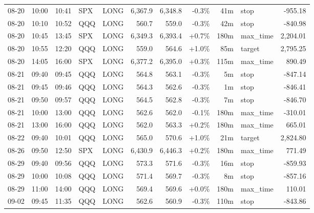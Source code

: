 \documentclass[11pt,a4paper,twoside]{article}
\begin{document}
\begin{center}
\begin{longtable}{>{\color{txtmain}}l l l l l r r r r >{\color{txtmain}}l r}
08-20 & 10:00 & 10:41 & SPX & LONG & 6,367.9 & 6,348.8 & \textcolor{lossred}{-0.3\%} & 41m & stop & \textcolor{lossred}{-955.18} \\
08-20 & 10:10 & 10:52 & QQQ & LONG & 560.7 & 559.0 & \textcolor{lossred}{-0.3\%} & 42m & stop & \textcolor{lossred}{-840.98} \\
08-20 & 10:45 & 13:45 & SPX & LONG & 6,349.3 & 6,393.4 & \textcolor{wingreen}{+0.7\%} & 180m & max\_time & \textcolor{wingreen}{2,204.01} \\
08-20 & 10:55 & 12:20 & QQQ & LONG & 559.0 & 564.6 & \textcolor{wingreen}{+1.0\%} & 85m & target & \textcolor{wingreen}{2,795.25} \\
08-20 & 14:05 & 16:00 & SPX & LONG & 6,377.2 & 6,395.0 & \textcolor{wingreen}{+0.3\%} & 115m & max\_time & \textcolor{wingreen}{890.49} \\
08-21 & 09:40 & 09:45 & QQQ & LONG & 564.8 & 563.1 & \textcolor{lossred}{-0.3\%} & 5m & stop & \textcolor{lossred}{-847.14} \\
08-21 & 09:45 & 09:46 & QQQ & LONG & 564.3 & 562.6 & \textcolor{lossred}{-0.3\%} & 1m & stop & \textcolor{lossred}{-846.41} \\
08-21 & 09:50 & 09:57 & QQQ & LONG & 564.5 & 562.8 & \textcolor{lossred}{-0.3\%} & 7m & stop & \textcolor{lossred}{-846.70} \\
08-21 & 10:00 & 13:00 & QQQ & LONG & 562.6 & 562.0 & \textcolor{lossred}{-0.1\%} & 180m & max\_time & \textcolor{lossred}{-310.01} \\
08-21 & 13:00 & 16:00 & QQQ & LONG & 562.0 & 563.3 & \textcolor{wingreen}{+0.2\%} & 180m & max\_time & \textcolor{wingreen}{665.01} \\
08-22 & 09:40 & 10:01 & QQQ & LONG & 565.0 & 570.6 & \textcolor{wingreen}{+1.0\%} & 21m & target & \textcolor{wingreen}{2,824.80} \\
08-26 & 09:50 & 12:50 & SPX & LONG & 6,430.9 & 6,446.3 & \textcolor{wingreen}{+0.2\%} & 180m & max\_time & \textcolor{wingreen}{771.49} \\
08-29 & 09:40 & 09:56 & QQQ & LONG & 573.3 & 571.6 & \textcolor{lossred}{-0.3\%} & 16m & stop & \textcolor{lossred}{-859.93} \\
08-29 & 10:00 & 10:08 & QQQ & LONG & 571.4 & 569.7 & \textcolor{lossred}{-0.3\%} & 8m & stop & \textcolor{lossred}{-857.16} \\
08-29 & 11:00 & 14:00 & QQQ & LONG & 569.4 & 569.6 & \textcolor{wingreen}{+0.0\%} & 180m & max\_time & \textcolor{wingreen}{110.01} \\
09-02 & 09:45 & 11:35 & QQQ & LONG & 562.6 & 560.9 & \textcolor{lossred}{-0.3\%} & 110m & stop & \textcolor{lossred}{-843.86} \\

\end{longtable}
\end{center}
\end{document}

